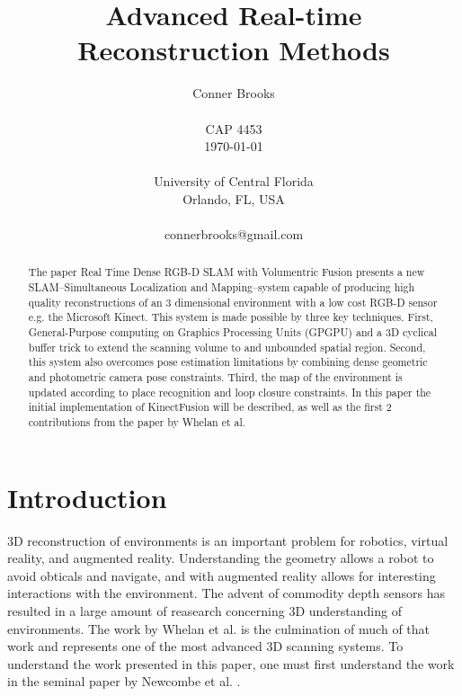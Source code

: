 \documentclass[10pt,twocolumn]{article}
\begin{document}
\title{Advanced Real-time Reconstruction Methods}

\author{Conner Brooks\\
\\
CAP 4453\\
\today \\
\\
University of Central Florida\\
Orlando, FL, USA\\
\\
connerbrooks@gmail.com\\
}

\maketitle
\thispagestyle{empty}

\begin{abstract}
The paper Real Time Dense RGB-D SLAM with Volumentric Fusion \cite{whelan14} presents a new SLAM--Simultaneous Localization and Mapping--system capable of producing high quality
reconstructions of an 3 dimensional environment with a low cost RGB-D sensor e.g. the Microsoft Kinect. This system is made possible by three key techniques.
First, General-Purpose computing on Graphics Processing Units (GPGPU) and a 3D 
  cyclical buffer trick to extend the scanning volume to and unbounded spatial
  region. Second, this system also overcomes pose estimation limitations by combining
  dense geometric and photometric camera pose constraints. Third, the map of the 
  environment is updated according to place recognition and loop closure constraints.
  In this paper the initial implementation of KinectFusion \cite{izadi11} \cite{newcombe11} will be described, as well as the first 2 contributions from the paper by Whelan et al.
  
\end{abstract}

\section{Introduction}
3D reconstruction of environments is an important problem for 
robotics, virtual reality, and augmented reality. Understanding the geometry
allows a robot to avoid obticals and navigate, and with augmented reality
allows for interesting interactions with the environment. The advent of
commodity depth sensors has resulted in a large amount of reasearch 
concerning 3D understanding of environments. The work by Whelan et al. is the 
culmination of much of that work and represents one of the most advanced 
3D scanning systems. To understand the work presented in this paper, one must
first understand the work in the seminal paper by Newcombe et al. \cite{newecombe11}.
\end{document}
